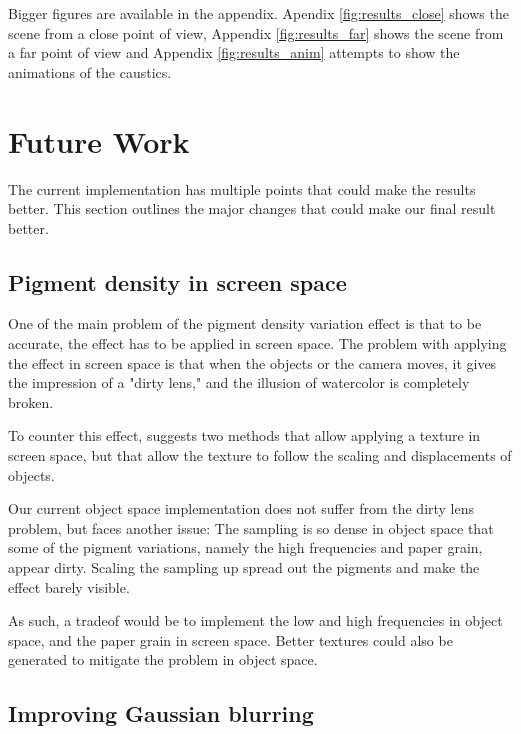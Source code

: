 \documentclass{article}
\begin{document}
\noindent
Bigger figures are available in the appendix. Apendix \ref{fig:results_close} shows the scene from a close point of view, Appendix \ref{fig:results_far} shows the scene from a far point of view and Appendix \ref{fig:results_anim} attempts to show the animations of the caustics.

\newpage
\section{Future Work}
\label{sec:future_work}
The current implementation has multiple points that could make the results better. This section outlines the major changes that could make our final result better.

\subsection{Pigment density in screen space}
One of the main problem of the pigment density variation effect is that to be accurate, 
the effect has to be applied in screen space. 
The problem with applying the effect in screen space is that when the objects or the camera moves, 
it gives the impression of a "dirty lens," and the illusion of watercolor is completely broken. 

\medskip \par
\noindent
To counter this effect, \cite{watercolor_paper} suggests two methods that allow applying a texture 
in screen space, but that allow the texture to follow the scaling and displacements of objects. 

\medskip \par
\noindent
Our current object space implementation does not suffer from the dirty lens problem, but faces another issue:
The sampling is so dense in object space that some of the pigment variations, namely the high frequencies and 
paper grain, appear dirty. Scaling the sampling up spread out the pigments and make the effect barely visible. 

\medskip \par
\noindent
As such, a tradeof would be to implement the low and high frequencies in object space, and the paper
grain in screen space. Better textures could also be generated to mitigate the problem in object space.

\subsection{Improving Gaussian blurring} 
\end{document}

